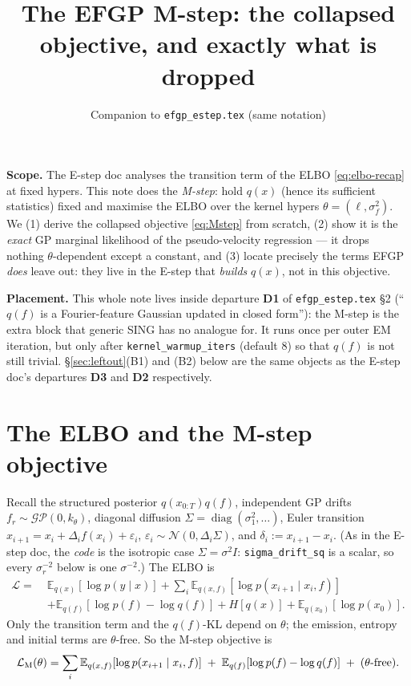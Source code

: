 \documentclass[11pt]{article}
\title{\textbf{The EFGP M-step: the collapsed objective, and exactly what is dropped}}
\author{Companion to \texttt{efgp\_estep.tex} (same notation)}
\date{}
\newcommand{\Eq}[2]{\mathbb{E}_{#1}\!\left[#2\right]}
\newcommand{\diag}{\operatorname{diag}}
\newcommand{\given}{\mid}
\newcommand{\code}[1]{\texttt{#1}}
\newcommand{\GP}{\mathcal{GP}}
\begin{document}
\maketitle

\noindent
\textbf{Scope.} The E-step doc analyses the transition term of the ELBO
\eqref{eq:elbo-recap} at fixed hypers. This note does the \emph{M-step}: hold
$q(x)$ (hence its sufficient statistics) fixed and maximise the ELBO over the
kernel hypers $\theta=(\ell,\sigma_f^2)$. We (1) derive the collapsed objective
\eqref{eq:Mstep} from scratch, (2) show it is the \emph{exact} GP marginal
likelihood of the pseudo-velocity regression --- it drops nothing $\theta$-dependent
except a constant, and (3) locate precisely the terms EFGP \emph{does} leave
out: they live in the E-step that \emph{builds} $q(x)$, not in this objective.

\noindent
\textbf{Placement.} This whole note lives inside departure \textbf{D1} of
\texttt{efgp\_estep.tex} \S2 (``$q(f)$ is a Fourier-feature Gaussian
updated in closed form''): the M-step is the extra block that generic SING
has no analogue for. It runs once per outer EM iteration, but only after
\code{kernel\_warmup\_iters} (default 8) so that $q(f)$ is not still
trivial. \S\ref{sec:leftout}(B1) and (B2) below are the same objects as
the E-step doc's departures \textbf{D3} and \textbf{D2} respectively.

\section{The ELBO and the M-step objective}
Recall the structured posterior $q(x_{0:T})q(f)$, independent GP drifts
$f_r\sim\GP(0,k_\theta)$, diagonal diffusion $\Sigma=\diag(\sigma_1^2,\dots)$,
Euler transition $x_{i+1}=x_i+\Delta_i f(x_i)+\varepsilon_i$,
$\varepsilon_i\sim\mathcal N(0,\Delta_i\Sigma)$, and $\delta_i:=x_{i+1}-x_i$.
(As in the E-step doc, the \emph{code} is the isotropic case
$\Sigma=\sigma^2I$: \code{sigma\_drift\_sq} is a scalar, so every
$\sigma_r^{-2}$ below is one $\sigma^{-2}$.) The ELBO is
\begin{equation}
\begin{aligned}
\mathcal L=\;&\Eq{q(x)}{\log p(y\given x)}
+\sum_i \Eq{q(x,f)}{\log p(x_{i+1}\given x_i,f)}\\
&+\Eq{q(f)}{\log p(f)-\log q(f)}
+H[q(x)]+\Eq{q(x_0)}{\log p(x_0)}.
\end{aligned}
\label{eq:elbo-recap}
\end{equation}
Only the transition term and the $q(f)$-KL depend on $\theta$; the emission,
entropy and initial terms are $\theta$-free. So the M-step objective is
\begin{equation}
\mathcal L_{\rm M}(\theta)
=\sum_i \Eq{q(x,f)}{\log p(x_{i+1}\given x_i,f)}
\;+\;\Eq{q(f)}{\log p(f)-\log q(f)}\;+\;\text{(}\theta\text{-free)}.
\label{eq:LM-raw}
\end{equation}
\end{document}
